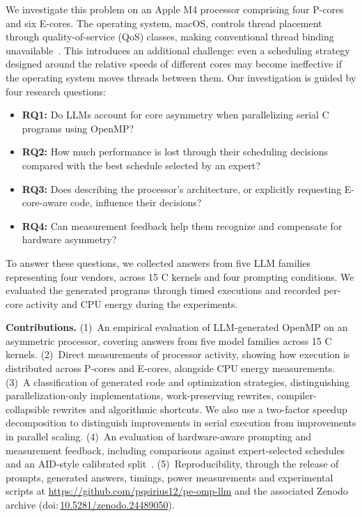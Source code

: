 \documentclass[conference]{IEEEtran}
\begin{document}
We investigate this problem on an Apple M4 processor comprising four P-cores and six E-cores. The operating system, macOS, controls thread placement through quality-of-service (QoS) classes, making conventional thread binding unavailable~\cite{eclectic2022m1sched,eclectic2021m1perf}. This introduces an additional challenge: even a scheduling strategy designed around the relative speeds of different cores may become ineffective if the operating system moves threads between them. Our investigation is guided by four research questions:
\begin{itemize}
\item \textbf{RQ1:} Do LLMs account for core asymmetry when parallelizing serial C programs using OpenMP?
\item \textbf{RQ2:} How much performance is lost through their scheduling decisions compared with the best schedule selected by an expert?
\item \textbf{RQ3:} Does describing the processor's architecture, or explicitly requesting E-core-aware code, influence their decisions?
\item \textbf{RQ4:} Can measurement feedback help them recognize and compensate for hardware asymmetry?
\end{itemize}
To answer these questions, we collected \NumAllAnswers{} answers from five LLM families representing four vendors, across 15 C kernels and four prompting conditions. We evaluated the generated programs through \NumTimedRunsAll{} timed executions and recorded per-core activity and CPU energy during the experiments.

\textbf{Contributions.}
(1)~An empirical evaluation of LLM-generated OpenMP on an asymmetric processor, covering \NumAllAnswers{} answers from five model families across 15 C kernels.
(2)~Direct measurements of processor activity, showing how execution is distributed across P-cores and E-cores, alongside CPU energy measurements.
(3)~A classification of generated code and optimization strategies, distinguishing parallelization-only implementations, work-preserving rewrites, compiler-collapsible rewrites and algorithmic shortcuts. We also use a two-factor speedup decomposition to distinguish improvements in serial execution from improvements in parallel scaling.
(4)~An evaluation of hardware-aware prompting and measurement feedback, including comparisons against expert-selected schedules and an AID-style calibrated split~\cite{saez2020aid}.
(5)~Reproducibility, through the release of prompts, generated answers, timings, power measurements and experimental scripts at \url{https://github.com/pqsirius12/pe-omp-llm} and the associated Zenodo archive (doi:\,\href{https://doi.org/10.5281/zenodo.24489050}{10.5281/zenodo.24489050}).
\end{document}

